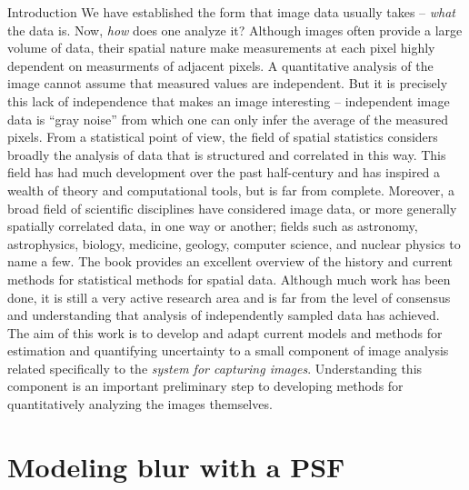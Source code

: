 \begin{chapter}{Introduction}
  We have established the form that image data usually takes -- \emph{what} the data is. 
  Now, \emph{how} does one analyze it?
  Although images often provide a large volume of data, their spatial nature make measurements at each pixel highly dependent on measurments of adjacent pixels.
  A quantitative analysis of the image cannot assume that measured values are independent.
  But it is precisely this lack of independence that makes an image interesting -- independent image data is ``gray noise'' from which one can only infer the average of the measured pixels.
  From a statistical point of view, the field of spatial statistics considers broadly the analysis of data that is structured and correlated in this way.
  This field has had much development over the past half-century and has inspired a wealth of theory and computational tools, but is far from complete.
  Moreover, a broad field of scientific disciplines have considered image data, or more generally spatially correlated data, in one way or another; fields such as astronomy, astrophysics, biology, medicine, geology, computer science, and nuclear physics to name a few.
  The book \citep{cressie1993statistics} provides an excellent overview of the history and current methods for statistical methods for spatial data.
  Although much work has been done, it is still a very active research area and is far from the level of consensus and understanding that analysis of independently sampled data has achieved. 
  The aim of this work is to develop and adapt current models and methods for estimation and quantifying uncertainty to a small component of image analysis related specifically to the \emph{system for capturing images}.
  Understanding this component is an important preliminary step to developing methods for quantitatively analyzing the images themselves.

\section{Modeling blur with a PSF}
  

\end{chapter}

